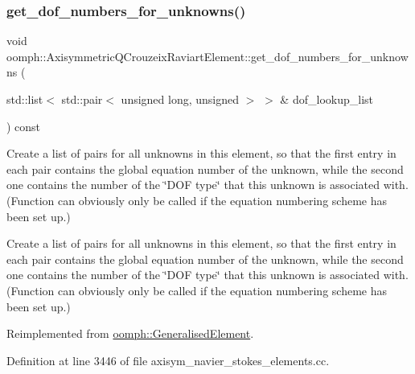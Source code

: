 \mbox{\label{classoomph_1_1AxisymmetricQCrouzeixRaviartElement_a83a50021a007f1a932fe841119d93412}} 
\subsubsection{\texorpdfstring{get\+\_\+dof\+\_\+numbers\+\_\+for\+\_\+unknowns()}{get\_dof\_numbers\_for\_unknowns()}}
{\footnotesize\ttfamily void oomph\+::\+Axisymmetric\+Q\+Crouzeix\+Raviart\+Element\+::get\+\_\+dof\+\_\+numbers\+\_\+for\+\_\+unknowns (\begin{DoxyParamCaption}\item[{std\+::list$<$ std\+::pair$<$ unsigned long, unsigned $>$ $>$ \&}]{dof\+\_\+lookup\+\_\+list }\end{DoxyParamCaption}) const\hspace{0.3cm}{\ttfamily [virtual]}}



Create a list of pairs for all unknowns in this element, so that the first entry in each pair contains the global equation number of the unknown, while the second one contains the number of the \char`\"{}\+D\+O\+F type\char`\"{} that this unknown is associated with. (Function can obviously only be called if the equation numbering scheme has been set up.) 

Create a list of pairs for all unknowns in this element, so that the first entry in each pair contains the global equation number of the unknown, while the second one contains the number of the \char`\"{}\+D\+O\+F type\char`\"{} that this unknown is associated with. (Function can obviously only be called if the equation numbering scheme has been set up.) 

Reimplemented from \hyperlink{classoomph_1_1GeneralisedElement_a069f59bfc3e607a5bebba52c6314d777}{oomph\+::\+Generalised\+Element}.



Definition at line 3446 of file axisym\+\_\+navier\+\_\+stokes\+\_\+elements.\+cc.




